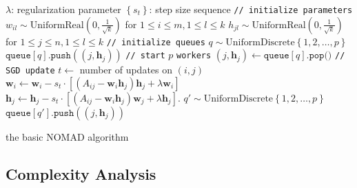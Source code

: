 \documentclass{vldb}
\newcommand{\hb}{\mathbf{h}}
\newcommand{\wb}{\mathbf{w}}
\newcommand{\rbr}[1]{\left(#1\right)}
\newcommand{\sbr}[1]{\left[#1\right]}
\newcommand{\cbr}[1]{\left\{#1\right\}}
\newcommand{\Omegabar}{\bar{\Omega}}
\begin{document}
\begin{algorithm}[htbp]
  \begin{algorithmic}[1]
    \State $\lambda$: regularization parameter
    \State $\cbr{s_t}$: step size sequence
    \State \texttt{// initialize parameters} 
    \State $w_{il} \sim \text{UniformReal}\rbr{0,\frac{1}{\sqrt{k}}}$ for 
      $1 \leq i \leq m, 1 \leq l \leq k$
    \State $h_{jl} \sim \text{UniformReal}\rbr{0,\frac{1}{\sqrt{k}}}$ for 
      $1 \leq j \leq n, 1 \leq l \leq k$
    \State \texttt{// initialize queues} 
    \For {$j \in \cbr{1,2,\ldots,n}$} 
      \State $q \sim \text{UniformDiscrete}\cbr{1,2,\ldots,p}$ 
      \State $\texttt{queue}[q] \texttt{.push}((j,\hb_j))$
    \EndFor
    \State \texttt{// start} $p$ \texttt{workers} 
    \Parstart{$q \in \cbr{1,2,\ldots,p}$}
          \State $(j, \hb_j) \gets \texttt{queue}[q]\texttt{.pop()}$ \label{alg:pop}
          \For{$(i,j) \in \Omegabar_j^{(q)}$} \label{alg:sgd_for_start}
            \State \texttt{// SGD update} 
            \State $t \leftarrow$ number of updates on $(i,j)$
            \State
            $\wb_{i} \leftarrow \wb_{i} - s_t \cdot
            \sbr{(A_{{i}{j}} - \wb_{i} \hb_{j}) \hb_{j}
              + \lambda \wb_{i}}$
            \State
            $\hb_{j} \leftarrow
            \hb_{j} - 
            s_t \cdot
            \sbr{(A_{{i}{j}} - \wb_{i} \hb_{j}) \wb_{j}
              + \lambda \hb_{j}}.$
          \EndFor  \label{alg:sgd_for_end}
          \State $q' \sim \text{UniformDiscrete}\cbr{1,2,\ldots,p}$
          \label{alg:sample_worker}
\State $\texttt{queue}[q'] \texttt{.push}((j,\hb_j))$
          \label{alg:push_to_queue}
        \EndIf
      \EndWhile
    \Parend
  \end{algorithmic}
\caption{the basic NOMAD algorithm}
  \label{alg:nomad}
\end{algorithm}


\subsection{Complexity Analysis}
\label{sec:complexity_analysis}
\end{document}
